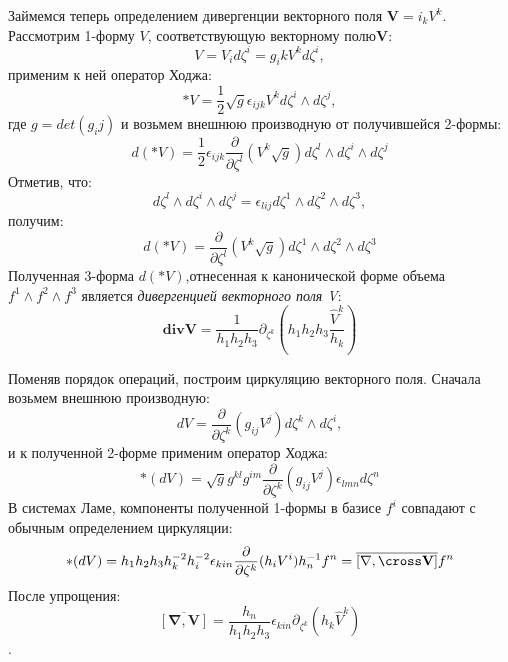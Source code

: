 \documentclass{article}
\begin{document}
Займемся теперь определением дивергенции векторного поля $\mathbf{V} = i_k V^k$. Рассмотрим 1-форму $V$, соответствующую векторному полю$\mathbf{V}$:
$$V = V_i d \zeta^i = g_ik V^k d \zeta^i,$$
применим к ней оператор Ходжа:
$$*V = \frac{1}{2} \sqrt{g} \epsilon_{ijk} V^k d \zeta^i \wedge d \zeta^j,$$
где $g = det (g_ij)$ и  возьмем внешнюю производную от получившейся 2-формы:
$$d(*V) = \frac{1}{2}  \epsilon_{ijk} \frac{\partial}{\partial \zeta^l} 
\left(V^k \sqrt{g}\right) d \zeta^l \wedge d \zeta^i \wedge d \zeta^j$$
Отметив, что:
$$ d\zeta^l \wedge d \zeta^i \wedge d \zeta^j = \epsilon_{lij} d \zeta^1 \wedge d \zeta^2 \wedge d \zeta^3,$$
получим:
$$d(*V) = \frac{\partial}{\partial \zeta^l} 
\left(V^k \sqrt{g}\right) d \zeta^1 \wedge d \zeta^2 \wedge d \zeta^3$$
Полученная 3-форма $d(*V)$,отнесенная к канонической форме объема $f^1 \wedge f^2 \wedge f^3$ является \textit{дивергенцией векторного поля V}:
$$ \mathbf{div} \mathbf{V} = \frac{1}{h_1 h_2 h_3} \partial_{\zeta^k} (h_1 h_2 h_3 \frac{\hat{V}^k}{h_k})$$ 

Поменяв порядок операций, построим циркуляцию векторного поля. Сначала возьмем внешнюю производную:
$$dV = \frac{\partial}{\partial \zeta^k} \left(g_{ij} V^j\right) d \zeta^k \wedge d \zeta^i,$$
и к полученной 2-форме применим оператор Ходжа:
$$*(dV) = \sqrt{g}g^{kl}g^{im} \frac{\partial}{\partial \zeta^k} (g_{ij} V^j) \epsilon_{lmn} d \zeta^n$$
В системах Ламе, компоненты полученной 1-формы в базисе $f^i$ совпадают с обычным определением циркуляции:
$$*(dV) = h_1 h_2 h_3 h^{-2}_k h^{-2}_i \epsilon_{kin} \frac{\partial}{\partial \zeta^k} (h_i V^i) h^{-1}_n f^n = \overline{[\mathbf{\nabla}, \cross \mathbf{V}]}f^n$$
После упрощения:
$$\overline{[\mathbf{\nabla}, \mathbf{V}]} = \frac{h_n}{h_1 h_2 h_3} \epsilon_{kin} \partial_{\zeta^k} (h_k \hat{V}^k)$$.
\end{document}
